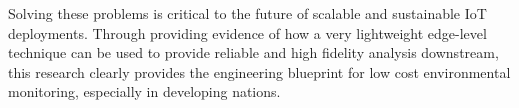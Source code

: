 Solving these problems is critical to the future of scalable and sustainable IoT deployments. Through providing evidence of how a very lightweight edge-level technique can be used to provide reliable and high fidelity analysis downstream, this research clearly provides the engineering blueprint for low cost environmental monitoring, especially in developing nations.
